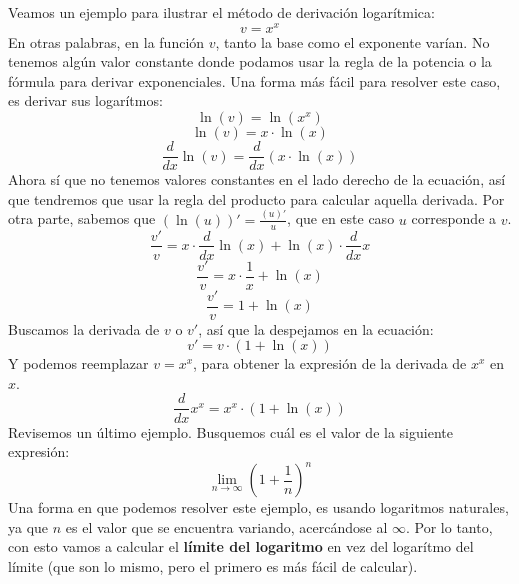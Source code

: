 \documentclass[12pt]{article}
\begin{document}
Veamos un ejemplo para ilustrar el método de derivación logarítmica:
\[v = x^{x}\]
En otras palabras, en la función $v$, tanto la base como el exponente varían. No tenemos algún valor constante donde podamos usar la regla de la potencia o la fórmula para derivar exponenciales. Una forma más fácil para resolver este caso, es derivar sus logarítmos:
\[\ln(v) = \ln(x^{x})\]
\[\ln(v) = x \cdot \ln(x)\]
\[\frac{d}{dx} \ln(v) = \frac{d}{dx} (x \cdot \ln(x))\]
Ahora sí que no tenemos valores constantes en el lado derecho de la ecuación, así que tendremos que usar la regla del producto para calcular aquella derivada. Por otra parte, sabemos que $(\ln(u))' = \frac{(u)'}{u}$, que en este caso $u$ corresponde a $v$.
\[\frac{v'}{v} = x \cdot \frac{d}{dx} \ln(x) + \ln(x) \cdot \frac{d}{dx} x\]
\[\frac{v'}{v} = x \cdot \frac{1}{x} + \ln(x)\]
\[\frac{v'}{v} = 1 + \ln(x)\]
Buscamos la derivada de $v$ o $v'$, así que la despejamos en la ecuación:
\[v' = v \cdot (1 + \ln(x))\]
Y podemos reemplazar $v = x^{x}$, para obtener la expresión de la derivada de $x^{x}$ en $x$.
\[\frac{d}{dx} x^{x} = x^{x} \cdot (1 + \ln(x))\]
Revisemos un último ejemplo. Busquemos cuál es el valor de la siguiente expresión:
\[\lim_{n \to \infty} \left(1 + \frac{1}{n}\right)^{n}\]
Una forma en que podemos resolver este ejemplo, es usando logaritmos naturales, ya que $n$ es el valor que se encuentra variando, acercándose al $\infty$. Por lo tanto, con esto vamos a calcular el \textbf{límite del logaritmo} en vez del logarítmo del límite (que son lo mismo, pero el primero es más fácil de calcular).
\end{document}
